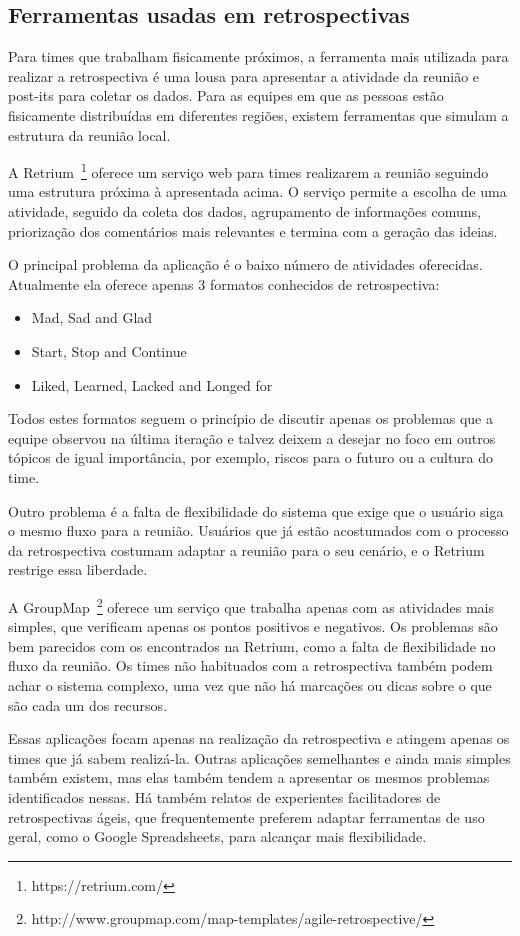 \subsection{Ferramentas usadas em retrospectivas}

Para times que trabalham fisicamente próximos, a ferramenta mais utilizada para realizar a retrospectiva é uma lousa para apresentar a atividade da reunião e post-its para coletar os dados. Para as equipes em que as pessoas estão fisicamente distribuídas em diferentes regiões, existem ferramentas que simulam a estrutura da reunião local.

A Retrium~\footnote{https://retrium.com/} oferece um serviço web para times realizarem a reunião seguindo uma estrutura próxima à apresentada acima. O serviço permite a escolha de uma atividade, seguido da coleta dos dados, agrupamento de informações comuns, priorização dos comentários mais relevantes e termina com a geração das ideias.

O principal problema da aplicação é o baixo número de atividades oferecidas. Atualmente ela oferece apenas 3 formatos conhecidos de retrospectiva:

\begin{itemize}
	\item Mad, Sad and Glad
	\item Start, Stop and Continue
	\item Liked, Learned, Lacked and Longed for
\end{itemize}

Todos estes formatos seguem o princípio de discutir apenas os problemas que a equipe observou na última iteração e talvez deixem a desejar no foco em outros tópicos de igual importância, por exemplo, riscos para o futuro ou a cultura do time.

Outro problema é a falta de flexibilidade do sistema que exige que o usuário siga o mesmo fluxo para a reunião. Usuários que já estão acostumados com o processo da retrospectiva costumam adaptar a reunião para o seu cenário, e o Retrium restrige essa liberdade.

A GroupMap~\footnote{http://www.groupmap.com/map-templates/agile-retrospective/} oferece um serviço que trabalha apenas com as atividades mais simples, que verificam apenas os pontos positivos e negativos. Os problemas são bem parecidos com os encontrados na Retrium, como a falta de flexibilidade no fluxo da reunião. Os times não habituados com a retrospectiva também podem achar o sistema complexo, uma vez que não há marcações ou dicas sobre o que são cada um dos recursos.

Essas aplicações focam apenas na realização da retrospectiva e atingem apenas os times que já sabem realizá-la. Outras aplicações semelhantes e ainda mais simples também existem, mas elas também tendem a apresentar os mesmos problemas identificados nessas. Há também relatos de experientes facilitadores de retrospectivas ágeis, que frequentemente preferem adaptar ferramentas de uso geral, como o Google Spreadsheets, para alcançar mais flexibilidade.

